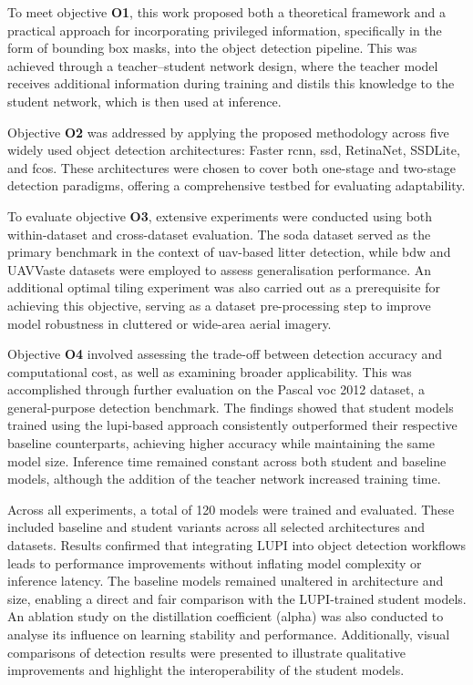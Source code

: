 To meet objective \textbf{O1}, this work proposed both a theoretical framework and a practical approach for incorporating privileged information, specifically in the form of bounding box masks, into the object detection pipeline. This was achieved through a teacher–student network design, where the teacher model receives additional information during training and distils this knowledge to the student network, which is then used at inference.

Objective \textbf{O2} was addressed by applying the proposed methodology across five widely used object detection architectures: Faster \gls{rcnn}, \gls{ssd}, RetinaNet, SSDLite, and \gls{fcos}. These architectures were chosen to cover both one-stage and two-stage detection paradigms, offering a comprehensive testbed for evaluating adaptability.

To evaluate objective \textbf{O3}, extensive experiments were conducted using both within-dataset and cross-dataset evaluation. The \gls{soda} dataset served as the primary benchmark in the context of \gls{uav}-based litter detection, while \gls{bdw} and UAVVaste datasets were employed to assess generalisation performance. An additional optimal tiling experiment was also carried out as a prerequisite for achieving this objective, serving as a dataset pre-processing step to improve model robustness in cluttered or wide-area aerial imagery.

Objective \textbf{O4} involved assessing the trade-off between detection accuracy and computational cost, as well as examining broader applicability. This was accomplished through further evaluation on the Pascal \gls{voc} 2012 dataset, a general-purpose detection benchmark. The findings showed that student models trained using the \gls{lupi}-based approach consistently outperformed their respective baseline counterparts, achieving higher accuracy while maintaining the same model size. Inference time remained constant across both student and baseline models, although the addition of the teacher network increased training time.

Across all experiments, a total of 120 models were trained and evaluated. These included baseline and student variants across all selected architectures and datasets. Results confirmed that integrating LUPI into object detection workflows leads to performance improvements without inflating model complexity or inference latency. The baseline models remained unaltered in architecture and size, enabling a direct and fair comparison with the LUPI-trained student models. An ablation study on the distillation coefficient (\gls{alpha}) was also conducted to analyse its influence on learning stability and performance. Additionally, visual comparisons of detection results were presented to illustrate qualitative improvements and highlight the interoperability of the student models.

